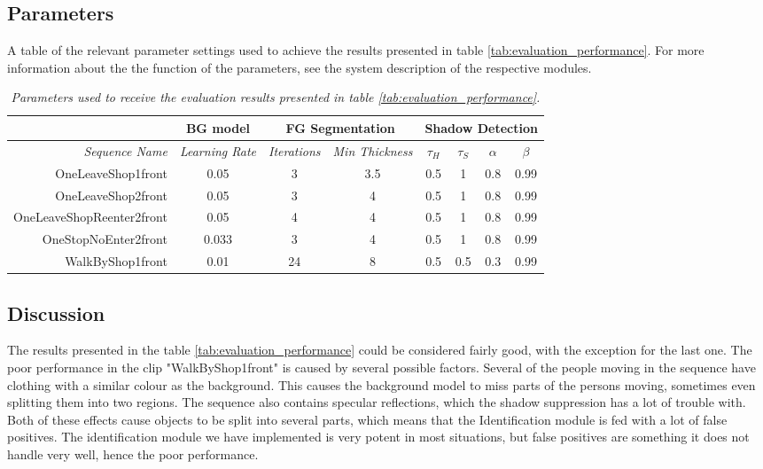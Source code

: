 \subsection{Parameters}
A table of the relevant parameter settings used to achieve the results presented in table \ref{tab:evaluation_performance}. For more information about the the function of the parameters, see the system description of the respective modules.
\begin{table}[h]
\centering
	\begin{tabular}{r | c || c | c || c | c | c | c }
	&	\multicolumn{1}{|c||}{BG model} & \multicolumn{2}{c||}{FG Segmentation} & \multicolumn{4}{c|}{Shadow Detection} \\
		\hline
		\emph{Sequence Name} & \emph{Learning Rate} & \emph{Iterations} & \emph{Min Thickness} &\emph{$\tau_H$} & \emph{$\tau_S$} & \emph{$\alpha$} & \emph{$\beta$}\\ 
		\hline \hline
		OneLeaveShop1front			& 0.05 		& 3 & 3.5 	& 0.5 & 1 & 0.8 & 0.99\\
		OneLeaveShop2front			& 0.05 		& 3 & 4 	& 0.5 & 1 & 0.8 & 0.99\\
		OneLeaveShopReenter2front	& 0.05		& 4 & 4 	& 0.5 & 1 & 0.8 & 0.99\\
		OneStopNoEnter2front 		& 0.033		& 3 & 4 	& 0.5 & 1 & 0.8 & 0.99\\
		WalkByShop1front 			& 0.01	 	& 24 & 8 	& 0.5 & 0.5 & 0.3 & 0.99\\
	\end{tabular}
	\caption{\textit{Parameters used to receive the evaluation results presented in table \ref{tab:evaluation_performance}.}}
	\label{tab:evaluation_parameters}
\end{table}

\subsection{Discussion}
The results presented in the table \ref{tab:evaluation_performance} could be considered fairly good, with the exception for the last one. The poor performance in the clip "WalkByShop1front" is caused by several possible factors. Several of the people moving in the sequence have clothing with a similar colour as the background. This causes the background model to miss parts of the persons moving, sometimes even splitting them into two regions. The sequence also contains specular reflections, which the shadow suppression has a lot of trouble with. Both of these effects cause objects to be split into several parts, which means that the Identification module is fed with a lot of false positives. The identification module we have implemented is very potent in most situations, but false positives are something it does not handle very well, hence the poor performance.


